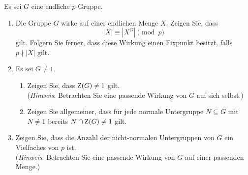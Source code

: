 \begin{question}[subtitle ={Wirkung von $p$-Grupppen}]
  Es sei $G$ eine endliche $p$-Gruppe.
  \begin{enumerate}
    \item
      Die Gruppe $G$ wirke auf einer endlichen Menge $X$.
      Zeigen Sie, dass
      \[
        |X| \equiv |X^G| \pmod{p}
      \]
      gilt.
      Folgern Sie ferner, dass diese Wirkung einen Fixpunkt besitzt, falls $p \nmid |X|$ gilt.
    \item
      Es sei $G \neq 1$.
      \begin{enumerate}
        \item
          Zeigen Sie, dass $\operatorname{Z}(G) \neq 1$ gilt. \\
          (\emph{Hinweis}: Betrachten Sie eine passende Wirkung von $G$ auf sich selbst.)
        \item
          Zeigen Sie allgemeiner, dass für jede normale Untergruppe $N \subseteq G$ mit $N \neq 1$ bereits $N \cap \operatorname{Z}(G) \neq 1$ gilt.
      \end{enumerate}
    \item
      Zeigen Sie, dass die Anzahl der nicht-normalen Untergruppen von $G$ ein Vielfaches von $p$ ist. \\
      (\emph{Hinweis}: Betrachten Sie eine passende Wirkung von $G$ auf einer passenden Menge.)
  \end{enumerate}
\end{question}


